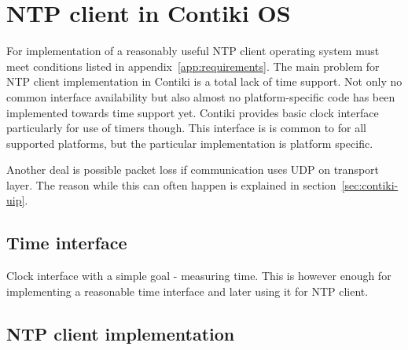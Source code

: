 
\chapter{NTP client in Contiki OS}

For implementation of a reasonably useful NTP client
operating system must meet conditions listed in appendix~\ref{app:requirements}.
The main problem for NTP client implementation in Contiki is a total
lack of time support.
Not only no common interface availability but also
almost no platform-specific code has been implemented towards time support yet.
Contiki provides basic clock interface particularly for use of timers though.
This interface is is common to for all supported platforms, but the particular implementation
is platform specific.

Another deal is possible packet loss if communication uses UDP on transport layer.
The reason while this can often happen is explained in section~\ref{sec:contiki-uip}.


\section{Time interface}
Clock interface with a simple goal - measuring time.
This is however enough for implementing a reasonable time interface and later using it for NTP client.




\section{NTP client implementation}
